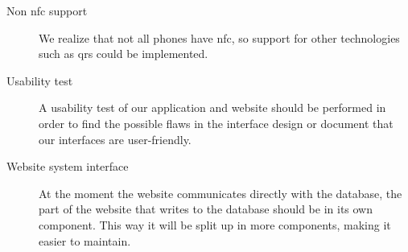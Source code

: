 \begin{description}
\item[Non \ac{nfc} support] We realize that not all phones have \ac{nfc}, so support for other technologies such as \acp{qr} could be implemented.
\item[Usability test] A usability test of our application and website should be performed in order to find the possible flaws in the interface design or document that our interfaces are user-friendly.
\item[Website system interface] At the moment the website communicates directly with the database, the part of the website that writes to the database should be in its own component. This way it will be split up in more components, making it easier to maintain.
\end{description}

